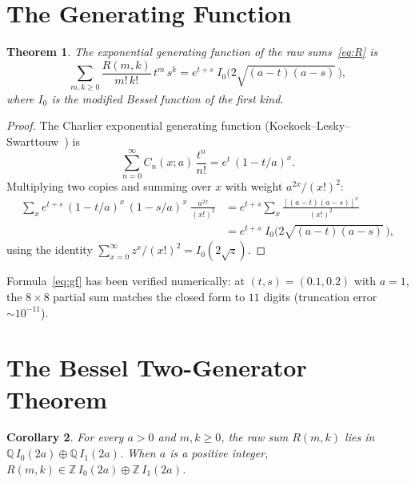 \documentclass[11pt,a4paper]{article}
\newtheorem{theorem}{Theorem}[section]
\newtheorem{corollary}[theorem]{Corollary}
\newcommand{\Z}{\mathbb{Z}}
\newcommand{\Q}{\mathbb{Q}}
\begin{document}
\section{The Generating Function}

\begin{theorem}\label{thm:gf}
The exponential generating function of the raw sums~\eqref{eq:R} is
\begin{equation}\label{eq:gf}
  \sum_{m,k \ge 0} \frac{R(m,k)}{m!\, k!}\, t^m\, s^k
  = e^{t+s}\; I_0\bigl(2\sqrt{(a-t)(a-s)}\,\bigr),
\end{equation}
where $I_0$ is the modified Bessel function of the first kind.
\end{theorem}

\begin{proof}
The Charlier exponential generating function
(Koekoek--Lesky--Swarttouw~\cite{KLS}) is
\[
  \sum_{n=0}^\infty C_n(x;a)\, \frac{t^n}{n!}
  = e^{t}\, (1-t/a)^x.
\]
Multiplying two copies and summing over $x$ with weight $a^{2x}/(x!)^2$:
\begin{align*}
  \sum_x e^{t+s}\, (1-t/a)^x\, (1-s/a)^x\;
  \frac{a^{2x}}{(x!)^2}
  &= e^{t+s} \sum_x \frac{[(a-t)(a-s)]^x}{(x!)^2} \\
  &= e^{t+s}\; I_0\bigl(2\sqrt{(a-t)(a-s)}\,\bigr),
\end{align*}
using the identity $\sum_{x=0}^\infty z^x/(x!)^2 = I_0(2\sqrt{z})$.
\end{proof}

Formula~\eqref{eq:gf} has been verified numerically: at $(t,s)=(0.1, 0.2)$
with $a=1$, the $8\times 8$ partial sum matches the closed form to
$11$ digits (truncation error $\sim 10^{-11}$).

\section{The Bessel Two-Generator Theorem}

\begin{corollary}\label{cor:bessel}
For every $a > 0$ and $m, k \ge 0$, the raw sum $R(m,k)$ lies in
$\Q\, I_0(2a) \oplus \Q\, I_1(2a)$.
When $a$ is a positive integer, $R(m,k) \in \Z\, I_0(2a) \oplus \Z\, I_1(2a)$.
\end{corollary}
\end{document}
